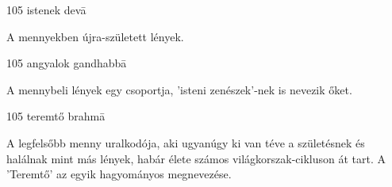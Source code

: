 
\begin{notesdescription}

\item[{105}
{istenek}
{devā}] \hfill\par

A mennyekben újra-született lények.

\item[{105}
{angyalok}
{gandhabbā}] \hfill\par

A mennybeli lények egy csoportja, 'isteni zenészek'-nek is nevezik őket.

\item[{105}
{teremtő}
{brahmā}] \hfill\par

A legfelsőbb menny uralkodója, aki ugyanúgy ki van téve a születésnek és halálnak mint más lények, habár élete számos világkorszak-cikluson át tart. A 'Teremtő' az egyik hagyományos megnevezése.

\end{notesdescription}

